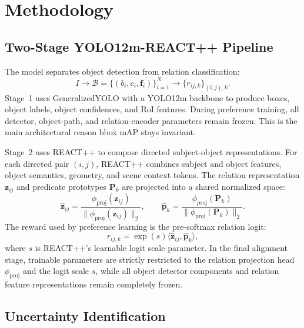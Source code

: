 \documentclass[10pt,twocolumn,letterpaper]{article}
\begin{document}
\section{Methodology}
\label{sec:methodology}

\subsection{Two-Stage YOLO12m-REACT++ Pipeline}

The model separates object detection from relation classification:
\begin{equation}
    I \rightarrow \mathcal{B}=\{(b_i,c_i,\mathbf{f}_i)\}_{i=1}^{N}
    \rightarrow \{r_{ij,k}\}_{(i,j),k}.
\end{equation}
Stage~1 uses GeneralizedYOLO with a YOLO12m backbone to produce boxes, object labels, object confidences, and RoI features. During preference training, all detector, object-path, and relation-encoder parameters remain frozen. This is the main architectural reason bbox mAP stays invariant.

Stage~2 uses REACT++ to compose directed subject-object representations. For each directed pair $(i,j)$, REACT++ combines subject and object features, object semantics, geometry, and scene context tokens. The relation representation $\mathbf{z}_{ij}$ and predicate prototypes $\mathbf{P}_k$ are projected into a shared normalized space:
\begin{equation}
    \hat{\mathbf{z}}_{ij} =
    \frac{\phi_{\mathrm{proj}}(\mathbf{z}_{ij})}
         {\|\phi_{\mathrm{proj}}(\mathbf{z}_{ij})\|_2},
    \qquad
    \hat{\mathbf{p}}_k =
    \frac{\phi_{\mathrm{proj}}(\mathbf{P}_k)}
         {\|\phi_{\mathrm{proj}}(\mathbf{P}_k)\|_2}.
\end{equation}
The reward used by preference learning is the pre-softmax relation logit:
\begin{equation}
    r_{ij,k} = \exp(s)\langle \hat{\mathbf{z}}_{ij},\hat{\mathbf{p}}_k\rangle,
    \label{eq:logits}
\end{equation}
where $s$ is REACT++'s learnable logit scale parameter. In the final alignment stage, trainable parameters are strictly restricted to the relation projection head $\phi_{\mathrm{proj}}$ and the logit scale $s$, while all object detector components and relation feature representations remain completely frozen.

\subsection{Uncertainty Identification}
\label{sec:uncertainty}
\end{document}
